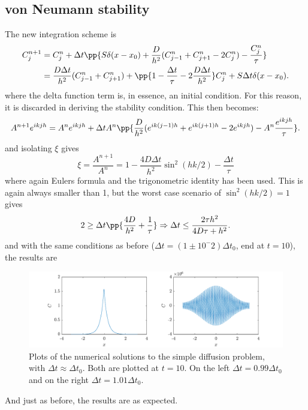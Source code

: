 \documentclass[a4paper,10pt]{article} 	%
\numberwithin{equation}{section}
\begin{document}
	\subsection{von Neumann stability}
	The new integration scheme is
	\begin{align}\label{key}
		C^{n+1}_j &= C_j^n+ \Delta t \pp{S\delta(x-x_0) + \frac{D}{h^2}(C_{j-1}^n+C_{j+1}^n-2C_j^n) -\frac{C_j^n}{\tau}} \\
		&= \frac{D\Delta t}{h^2} (C_{j-1}^n+C_{j+1}^n) + \pp{1-\frac{\Delta t}{\tau} - 2\frac{D\Delta t}{h^2}}C_j^n + S\Delta t \delta(x-x_0).
	\end{align}
	where the delta function term is, in essence, an initial condition. For this reason, it is discarded in deriving the stability condition. This then becomes:
	\begin{equation}\label{key}
		A^{n+1} e^{ikjh} = A^n e^{ikjh}+ \Delta t A^n \pp{\frac{D}{h^2}(e^{ik(j-1)h}+e^{ik(j+1)h}-2e^{ikjh}) -A^n \frac{e^{ikjh}}{\tau}}.
	\end{equation}
	and isolating $ \xi $ gives
	\begin{equation}\label{key}
		\xi = \frac{A^{n+1}}{A^n} = 1 - \frac{4D \Delta t}{h^2} \sin^2(hk/2)- \frac{\Delta t}{\tau}
	\end{equation}
	where again Eulers formula and the trigonometric identity has been used. This is again always smaller than 1, but the worst case scenario of $ \sin^2(hk/2) = 1 $ gives
	\begin{equation}\label{key}
		2 \geq \Delta t \pp{\frac{4 D}{h^2}+\frac{1}{\tau}} \Rightarrow \Delta t \leq \frac{2\tau h^2}{4D\tau + h^2}.
	\end{equation}
	and with the same conditions as before ($ \Delta t = (1\pm 10^-2) \Delta t_0 $, end at $ t=10 $), the results are
	\begin{figure}[H]
		\centering
		\includegraphics[width = \linewidth]{vonNeumann2.pdf}
		\caption{Plots of the numerical solutions to the simple diffusion problem, with $ \Delta t \approx \Delta t_0 $. Both are plotted at $ t = 10 $. On the left $ \Delta t = 0.99 \Delta t_0 $ and on the right $ \Delta t = 1.01 \Delta t_0 $.}
		\label{fig:von2}
	\end{figure}
	And just as before, the results are as expected.
	
\end{document}
